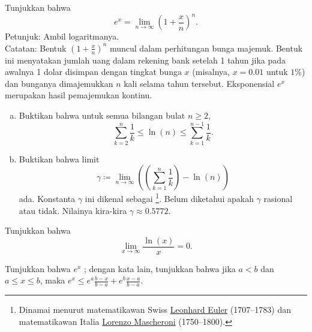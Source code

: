 \begin{exercise}
Tunjukkan bahwa
\begin{equation*}
e^x = \lim_{n\to\infty} {\left( 1 + \frac{x}{n} \right)}^n .
\end{equation*}
Petunjuk: Ambil logaritmanya.\\
Catatan: Bentuk
${\left( 1 + \frac{x}{n} \right)}^n$ muncul dalam perhitungan bunga
majemuk.  Bentuk ini menyatakan jumlah uang dalam rekening bank setelah 1 tahun
jika pada awalnya 1 dolar disimpan dengan tingkat bunga $x$ (misalnya, $x=0.01$ untuk
$1\%$) dan bunganya dimajemukkan $n$
kali selama tahun tersebut.  Eksponensial $e^x$ merupakan hasil pemajemukan
kontinu.
\end{exercise}

\begin{samepage}
\begin{exercise}
\leavevmode
\begin{enumerate}[a)]
\item
Buktikan bahwa untuk semua bilangan bulat $n \geq 2$,
\begin{equation*}
\sum_{k=2}^{n}
\frac{1}{k}
\leq
\ln (n)
\leq
\sum_{k=1}^{n-1}
\frac{1}{k} .
\end{equation*}
\item
Buktikan bahwa limit
\begin{equation*}
\gamma \coloneqq \lim_{n\to\infty}
\left( \left( \sum_{k=1}^{n} \frac{1}{k} \right) - \ln (n) \right)
\end{equation*}
ada.  Konstanta $\gamma$ ini dikenal sebagai
\emph{}%
\footnote{Dinamai menurut matematikawan Swiss
\href{https://en.wikipedia.org/wiki/Leonhard_Euler}{Leonhard Euler}
(1707--1783)
dan matematikawan Italia
\href{https://en.wikipedia.org/wiki/Lorenzo_Mascheroni}{Lorenzo Mascheroni}
(1750--1800).}.  Belum diketahui apakah $\gamma$ rasional atau tidak.
Nilainya kira-kira $\gamma \approx 0.5772$.
\end{enumerate}
\end{exercise}
\end{samepage}

\begin{exercise}
Tunjukkan bahwa
\begin{equation*}
\lim_{x\to\infty} \frac{\ln(x)}{x} = 0 .
\end{equation*}
\end{exercise}

\begin{exercise}
Tunjukkan bahwa $e^x$ \emph{}; dengan kata lain, tunjukkan bahwa
jika $a < b$ dan $a \leq x \leq b$, maka
$e^x \leq e^a \frac{b-x}{b-a} + e^b \frac{x-a}{b-a}$.
\end{exercise}

